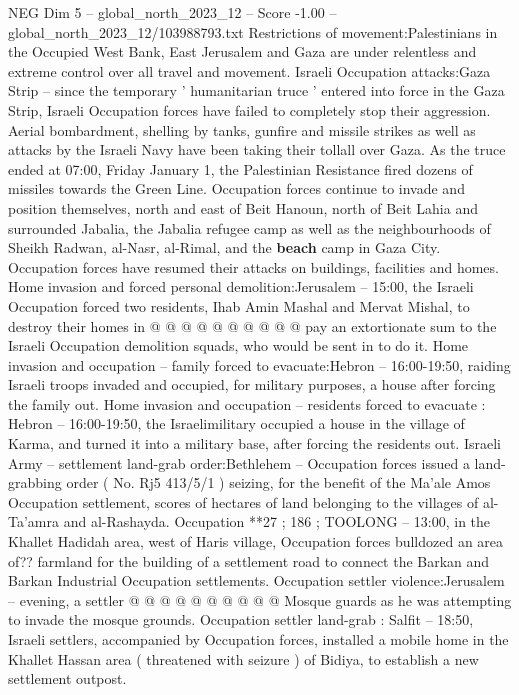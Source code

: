 \begin{textsample}{NEG Dim 5 – global\_north\_2023\_12 – Score -1.00 – global\_north\_2023\_12/103988793.txt}  \label{ex:f5_neg_114}
Restrictions of movement:Palestinians in the Occupied West Bank, East Jerusalem and Gaza are under relentless and extreme control over all travel and movement.
Israeli Occupation attacks:Gaza Strip -- since the temporary ' humanitarian truce ' entered into force in the Gaza Strip, Israeli Occupation forces have failed to completely stop their aggression.
Aerial bombardment, shelling by tanks, gunfire and missile strikes as well as attacks by the Israeli Navy have been taking their tollall over Gaza.
As the truce ended at 07:00, Friday January 1, the Palestinian Resistance fired dozens of missiles towards the Green Line.
Occupation forces continue to invade and position themselves, north and east of Beit Hanoun, north of Beit Lahia and surrounded Jabalia, the Jabalia refugee camp as well as the neighbourhoods of Sheikh Radwan, al-Nasr, al-Rimal, and the \textbf{beach} camp in Gaza City.
Occupation forces have resumed their attacks on buildings, facilities and homes.
Home invasion and forced personal demolition:Jerusalem -- 15:00, the Israeli Occupation forced two residents, Ihab Amin Mashal and Mervat Mishal, to destroy their homes in @ @ @ @ @ @ @ @ @ @ pay an extortionate sum to the Israeli Occupation demolition squads, who would be sent in to do it.
Home invasion and occupation -- family forced to evacuate:Hebron -- 16:00-19:50, raiding Israeli troops invaded and occupied, for military purposes, a house after forcing the family out.
Home invasion and occupation -- residents forced to evacuate : Hebron -- 16:00-19:50, the Israelimilitary occupied a house in the village of Karma, and turned it into a military base, after forcing the residents out.
Israeli Army -- settlement land-grab order:Bethlehem -- Occupation forces issued a land-grabbing order ( No.
Rj5 413/5/1 ) seizing, for the benefit of the Ma'ale Amos Occupation settlement, scores of hectares of land belonging to the villages of al-Ta'amra and al-Rashayda.
Occupation **27 ; 186 ; TOOLONG -- 13:00, in the Khallet Hadidah area, west of Haris village, Occupation forces bulldozed an area of?? farmland for the building of a settlement road to connect the Barkan and Barkan Industrial Occupation settlements.
Occupation settler violence:Jerusalem -- evening, a settler @ @ @ @ @ @ @ @ @ @ Mosque guards as he was attempting to invade the mosque grounds.
Occupation settler land-grab : Salfit -- 18:50, Israeli settlers, accompanied by Occupation forces, installed a mobile home in the Khallet Hassan area ( threatened with seizure ) of Bidiya, to establish a new settlement outpost.

\end{textsample}
